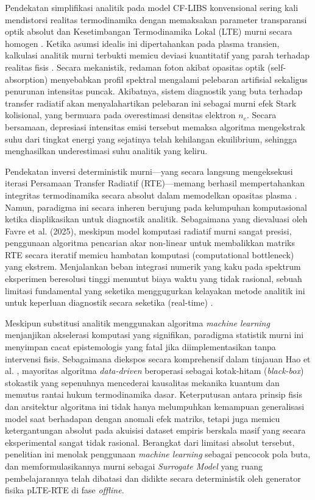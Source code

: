 \documentclass[10pt,leqno]{amsart}
\begin{document}
Pendekatan simplifikasi analitik pada model CF-LIBS konvensional sering kali mendistorsi realitas termodinamika dengan memaksakan parameter transparansi optik absolut dan Kesetimbangan Termodinamika Lokal (LTE) murni secara homogen \cite{cristoforetti_local_2010}. Ketika asumsi idealis ini dipertahankan pada plasma transien, kalkulasi analitik murni terbukti memicu deviasi kuantitatif yang parah terhadap realitas fisis \cite{hansen_modeling_2021}. Secara mekanistik, redaman foton akibat opasitas optik (self-absorption) menyebabkan profil spektral mengalami pelebaran artifisial sekaligus penurunan intensitas puncak. Akibatnya, sistem diagnostik yang buta terhadap transfer radiatif akan menyalahartikan pelebaran ini sebagai murni efek Stark kolisional, yang bermuara pada overestimasi densitas elektron $n_e$. Secara bersamaan, depresiasi intensitas emisi tersebut memaksa algoritma mengekstrak suhu dari tingkat energi yang sejatinya telah kehilangan ekuilibrium, sehingga menghasilkan underestimasi suhu analitik yang keliru. 

Pendekatan inversi deterministik murni—yang secara langsung mengeksekusi iterasi Persamaan Transfer Radiatif (RTE)—memang berhasil mempertahankan integritas termodinamika secara absolut dalam memodelkan opasitas plasma \cite{hansen_modeling_2021, favre_merlin_2025}. Namun, paradigma ini secara inheren berujung pada kelumpuhan komputasional ketika diaplikasikan untuk diagnostik analitik. Sebagaimana yang dievaluasi oleh Favre et al. (2025), meskipun model komputasi radiatif murni sangat presisi, penggunaan algoritma pencarian akar non-linear untuk membalikkan matriks RTE secara iteratif memicu hambatan komputasi (computational bottleneck) yang ekstrem. Menjalankan beban integrasi numerik yang kaku pada spektrum eksperimen beresolusi tinggi menuntut biaya waktu yang tidak rasional, sebuah limitasi fundamental yang seketika menggugurkan kelayakan metode analitik ini untuk keperluan diagnostik secara seketika (real-time) \cite{favre_towards_2025}.

Meskipun substitusi analitik menggunakan algoritma \textit{machine learning} menjanjikan akselerasi komputasi yang signifikan, paradigma statistik murni ini menyimpan cacat epistemologis yang fatal jika diimplementasikan tanpa intervensi fisis. Sebagaimana diekspos secara komprehensif dalam tinjauan Hao et al. \cite{hao_machine_2024}, mayoritas algoritma \textit{data-driven} beroperasi sebagai kotak-hitam (\textit{black-box}) stokastik yang sepenuhnya mencederai kausalitas mekanika kuantum dan memutus rantai hukum termodinamika dasar. Keterputusan antara prinsip fisis dan arsitektur algoritma ini tidak hanya melumpuhkan kemampuan generalisasi model saat berhadapan dengan anomali efek matriks, tetapi juga memicu ketergantungan absolut pada akuisisi dataset empiris berskala masif yang secara eksperimental sangat tidak rasional. Berangkat dari limitasi absolut tersebut, penelitian ini menolak penggunaan \textit{machine learning} sebagai pencocok pola buta, dan memformulasikannya murni sebagai \textit{Surrogate Model} yang ruang pembelajarannya telah dibatasi dan didikte secara deterministik oleh generator fisika pLTE-RTE di fase \textit{offline}.
\end{document}
